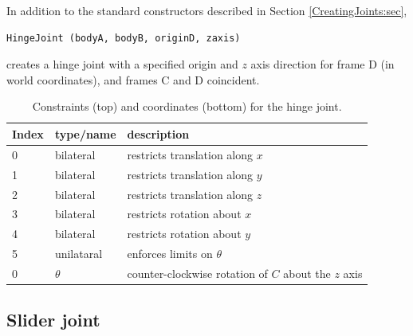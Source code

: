 In addition to the standard constructors described in
Section \ref{CreatingJoints:sec},
\begin{lstlisting}[]
  HingeJoint (bodyA, bodyB, originD, zaxis)
\end{lstlisting}
%
creates a hinge joint with a specified origin and $z$ axis direction
for frame D (in world coordinates), and frames C and D coincident.

\begin{table}[h]
\centering
\begin{tabular}{|l|l|l|}
\hline
Index & type/name & description \\
\hline
0 & bilateral & restricts translation along $x$ \\
1 & bilateral & restricts translation along $y$ \\
2 & bilateral & restricts translation along $z$ \\
3 & bilateral & restricts rotation about $x$ \\
4 & bilateral & restricts rotation about $y$ \\
5 & unilataral & enforces limits on $\theta$ \\
\hline
\hline
0 & $\theta$ & counter-clockwise rotation of $C$ about the $z$ axis \\
\hline
\end{tabular}
\caption{Constraints (top) and coordinates (bottom) for the hinge joint.}
\label{HingeConstraints:tbl}
\end{table}

\subsection{Slider joint}

